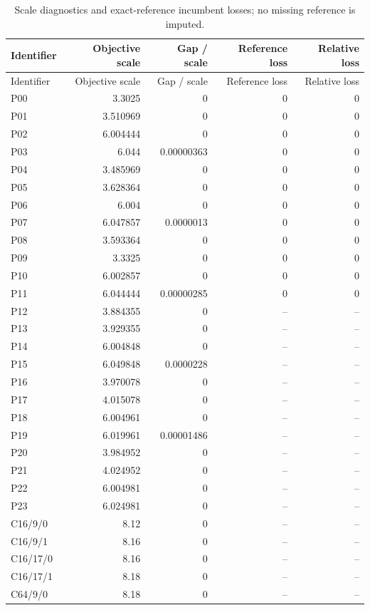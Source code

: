 \begin{longtable}{lrrrr}
\caption{Scale diagnostics and exact-reference incumbent losses; no missing reference is imputed.}\label{tab:r49-scales}\\
\toprule
Identifier & Objective scale & Gap / scale & Reference loss & Relative loss \\
\midrule\endfirsthead
\toprule
Identifier & Objective scale & Gap / scale & Reference loss & Relative loss \\
\midrule\endhead
P00 & 3.3025 & 0 & 0 & 0 \\
P01 & 3.510969 & 0 & 0 & 0 \\
P02 & 6.004444 & 0 & 0 & 0 \\
P03 & 6.044 & 0.00000363 & 0 & 0 \\
P04 & 3.485969 & 0 & 0 & 0 \\
P05 & 3.628364 & 0 & 0 & 0 \\
P06 & 6.004 & 0 & 0 & 0 \\
P07 & 6.047857 & 0.0000013 & 0 & 0 \\
P08 & 3.593364 & 0 & 0 & 0 \\
P09 & 3.3325 & 0 & 0 & 0 \\
P10 & 6.002857 & 0 & 0 & 0 \\
P11 & 6.044444 & 0.00000285 & 0 & 0 \\
P12 & 3.884355 & 0 & -- & -- \\
P13 & 3.929355 & 0 & -- & -- \\
P14 & 6.004848 & 0 & -- & -- \\
P15 & 6.049848 & 0.0000228 & -- & -- \\
P16 & 3.970078 & 0 & -- & -- \\
P17 & 4.015078 & 0 & -- & -- \\
P18 & 6.004961 & 0 & -- & -- \\
P19 & 6.019961 & 0.00001486 & -- & -- \\
P20 & 3.984952 & 0 & -- & -- \\
P21 & 4.024952 & 0 & -- & -- \\
P22 & 6.004981 & 0 & -- & -- \\
P23 & 6.024981 & 0 & -- & -- \\
C16/9/0 & 8.12 & 0 & -- & -- \\
C16/9/1 & 8.16 & 0 & -- & -- \\
C16/17/0 & 8.16 & 0 & -- & -- \\
C16/17/1 & 8.18 & 0 & -- & -- \\
C64/9/0 & 8.18 & 0 & -- & -- \\

\end{longtable}
